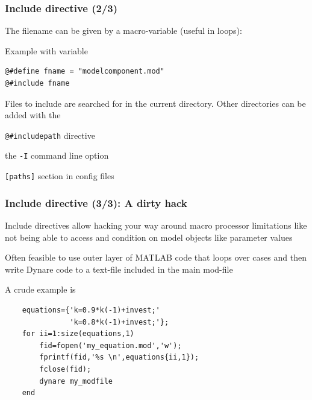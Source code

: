 \documentclass[handout,usepdftitle=false,xcolor=dvipsnames,aspectratio=169]{beamer}
\begin{document}
\begin{frame}[fragile]
  \frametitle{Include directive (2/3)}
  \begin{witemize}
    \item The filename can be given by a macro-variable (useful in loops):
    \begin{block}{Example with variable}
      \begin{verbatim}
@#define fname = "modelcomponent.mod"
@#include fname
\end{verbatim}
    \end{block}
    \item Files to include are searched for in the current directory. Other directories can
    be added with the
    \begin{witemize}
      \item \verb+@#includepath+ directive
      \item the \texttt{-I} command line option
      \item \texttt{[paths]} section in config files
    \end{witemize}
  \end{witemize}
\end{frame}


\begin{frame}[fragile]
  \frametitle{Include directive (3/3): A dirty hack}
  \begin{witemize}
    \item Include directives allow hacking your way around macro processor limitations like not being able to access and condition on model objects like parameter values
    \item Often feasible to use outer layer of MATLAB code that loops over cases and then write Dynare code to a text-file included in the main mod-file
    \item A crude example is
    \begin{verbatim}
    equations={'k=0.9*k(-1)+invest;'
               'k=0.8*k(-1)+invest;'};
    for ii=1:size(equations,1)
        fid=fopen('my_equation.mod','w');
        fprintf(fid,'%s \n',equations{ii,1});
        fclose(fid);
        dynare my_modfile
    end
    \end{verbatim}


  \end{witemize}
\end{frame}
\end{document}
